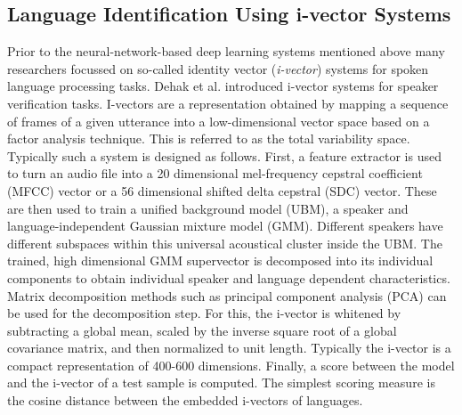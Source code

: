 \subsection{Language Identification Using i-vector Systems}
Prior to the neural-network-based deep learning systems mentioned above many researchers focussed on so-called identity vector (\emph{i-vector}) systems for spoken language processing tasks. Dehak et al. introduced i-vector systems for speaker verification tasks.\cite{dehak2011front} I-vectors are a representation obtained by mapping a sequence of frames of a given utterance into a low-dimensional vector space based on a factor analysis technique. This is referred to as the total variability space.  Typically such a system is designed as follows. First, a feature extractor is used to turn an audio file into a 20 dimensional mel-frequency cepstral coefficient (MFCC) vector or a 56 dimensional shifted delta cepstral (SDC) vector. These are then used to train a unified background model (UBM), a speaker and language-independent Gaussian mixture model (GMM). Different speakers have different subspaces within this universal acoustical cluster inside the UBM. The trained, high dimensional GMM supervector is decomposed into its individual components to obtain individual speaker and language dependent characteristics. Matrix decomposition methods such as principal component analysis (PCA) can be used for the decomposition step. For this, the i-vector is whitened by subtracting a global mean, scaled by the inverse square root of a global covariance matrix, and then normalized to unit length.\cite{garcia2011analysis} Typically the i-vector is a compact representation of 400-600 dimensions. Finally, a score between the model and the i-vector of a test sample is computed. The simplest scoring measure is the cosine distance between the embedded i-vectors of languages.

